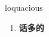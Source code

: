 
\begin{frame}
{\huge loquacious}
\begin{center}
\begin{enumerate}\Large
  \item \textbf{话多的}
\end{enumerate}
\end{center}
\end{frame}
